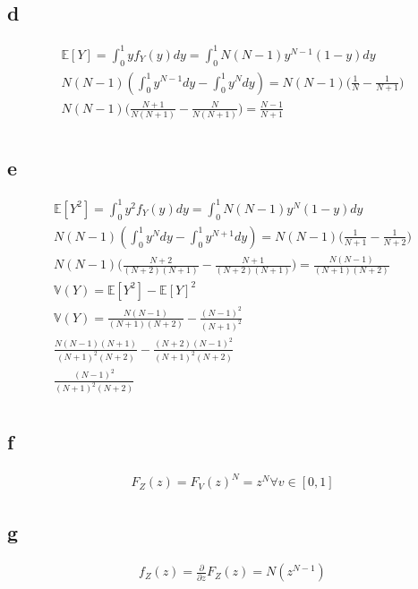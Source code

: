 \documentclass[10pt]{paper}
\begin{document}
\subsection*{d}
\begin{align*}
  \mathbb{E}[Y] = \int_0^1 y f_Y(y)dy = \int_0^1 N(N-1)y^{N-1}(1-y)dy\\
  N(N-1) ( \int_0^1 y^{N-1}dy - \int_0^1 y^N dy ) = N(N-1) \big ( \frac{1}{N} -\frac{1}{N+1} \big )\\
  N(N-1) \big ( \frac{N+1}{N(N+1)} - \frac{N}{N(N+1)} \big ) = \frac{N-1}{N+1}\\
\end{align*}

\subsection*{e}

\begin{align*}
  \mathbb{E}[Y^2] = \int_0^1 y^2 f_Y(y)dy = \int_0^1 N(N-1)y^{N}(1-y)dy\\
  N(N-1) ( \int_0^1 y^{N}dy - \int_0^1 y^{N+1} dy ) = N(N-1) \big ( \frac{1}{N+1} -\frac{1}{N+2} \big )\\
  N(N-1) \big ( \frac{N+2}{(N+2)(N+1)} - \frac{N+1}{(N+2)(N+1)} \big ) = \frac{N(N-1)}{(N+1)(N+2)}\\
  \mathbb{V}(Y) = \mathbb{E}[Y^2] -\mathbb{E}[Y]^2\\
  \mathbb{V}(Y) = \frac{N(N-1)}{(N+1)(N+2)} -\frac{(N-1)^2}{(N+1)^2}\\
  \frac{N(N-1)(N+1)}{(N+1)^2(N+2)} - \frac{(N+2)(N-1)^2}{(N+1)^2(N+2)}\\
  \frac{(N-1)^2 }{(N+1)^2(N+2)}\\
\end{align*}

\subsection*{f}

\begin{align*}
  F_Z(z) = F_V(z)^N = z^N \forall v \in [0,1]
\end{align*}

\subsection*{g}

\begin{align*}
  f_Z(z) = \frac{\partial}{\partial z}F_Z(z) = N( z^{N-1} )
\end{align*}
\end{document}
